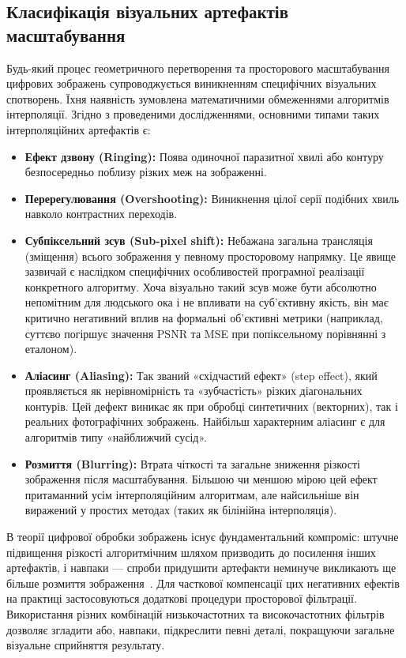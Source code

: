 \subsection{Класифікація візуальних артефактів масштабування}

Будь-який процес геометричного перетворення та просторового масштабування цифрових зображень супроводжується виникненням специфічних візуальних спотворень. Їхня наявність зумовлена математичними обмеженнями алгоритмів інтерполяції. Згідно з проведеними дослідженнями, основними типами таких інтерполяційних артефактів є:

\begin{itemize}
	\item \textbf{Ефект дзвону (Ringing):} Поява одиночної паразитної хвилі або контуру безпосередньо поблизу різких меж на зображенні.
	
	\item \textbf{Перерегулювання (Overshooting):} Виникнення цілої серії подібних хвиль навколо контрастних переходів.
	
	\item \textbf{Субпіксельний зсув (Sub-pixel shift):} Небажана загальна трансляція (зміщення) всього зображення у певному просторовому напрямку. Це явище зазвичай є наслідком специфічних особливостей програмної реалізації конкретного алгоритму. Хоча візуально такий зсув може бути абсолютно непомітним для людського ока і не впливати на суб'єктивну якість, він має критично негативний вплив на формальні об'єктивні метрики (наприклад, суттєво погіршує значення PSNR та MSE при попіксельному порівнянні з еталоном).
	
	\item \textbf{Аліасинг (Aliasing):} Так званий «східчастий ефект» (step effect), який проявляється як нерівномірність та «зубчастість» різких діагональних контурів. Цей дефект виникає як при обробці синтетичних (векторних), так і реальних фотографічних зображень. Найбільш характерним аліасинг є для алгоритмів типу «найближчий сусід».
	
	\item \textbf{Розмиття (Blurring):} Втрата чіткості та загальне зниження різкості зображення після масштабування. Більшою чи меншою мірою цей ефект притаманний усім інтерполяційним алгоритмам, але найсильніше він виражений у простих методах (таких як білінійна інтерполяція).
\end{itemize}

В теорії цифрової обробки зображень існує фундаментальний компроміс: штучне підвищення різкості алгоритмічним шляхом призводить до посилення інших артефактів, і навпаки — спроби придушити артефакти неминуче викликають ще більше розмиття зображення~\cite{mihov_image_filtering}. Для часткової компенсації цих негативних ефектів на практиці застосовуються додаткові процедури просторової фільтрації. Використання різних комбінацій низькочастотних та високочастотних фільтрів дозволяє згладити або, навпаки, підкреслити певні деталі, покращуючи загальне візуальне сприйняття результату.